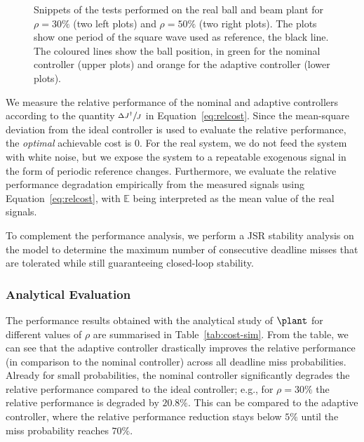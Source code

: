 \begin{figure*}
    \centering
    
    \caption{Snippets of the tests performed on the real ball and beam plant for $\rho=30\%$ (two left plots) and $\rho=50\%$ (two right plots).
        The plots show one period of the square wave used as reference, the black line.
        The coloured lines show the ball position, in green for the nominal controller (upper plots) and orange for the adaptive controller (lower plots).}
    \label{fig:real-plant}
\end{figure*}

We measure the relative performance of the nominal and adaptive controllers according to the quantity $\sfrac{\Delta J^\dagger}{J}$ in Equation~\eqref{eq:relcost}.
Since the mean-square deviation from the ideal controller is used to evaluate the relative performance, the \emph{optimal} achievable cost is $0$.
For the real system, we do not feed the system with white noise, but we expose the system to a repeatable exogenous signal in the form of periodic reference changes. 
Furthermore, we evaluate the relative performance degradation empirically from the measured signals using Equation~\eqref{eq:relcost}, with $\mathbb{E}$ being interpreted as the mean value of the real signals.

To complement the performance analysis, we perform a JSR stability analysis on the model to determine the maximum number of consecutive deadline misses that are tolerated while still guaranteeing closed-loop stability.

\subsubsection*{Analytical Evaluation}
The performance results obtained with the analytical study of $\plant$ for different values of $\rho$ are summarised in Table~\ref{tab:cost-sim}.
From the table, we can see that the adaptive controller drastically improves the relative performance (in comparison to the nominal controller) across all deadline miss probabilities.
Already for small probabilities, the nominal controller significantly degrades the relative performance compared to the ideal controller; e.g., for $\rho = 30\%$ the relative performance is degraded by $20.8\%$. This can be compared to the  adaptive controller, where the relative performance reduction stays below $5\%$ until the miss probability reaches $70\%$.


